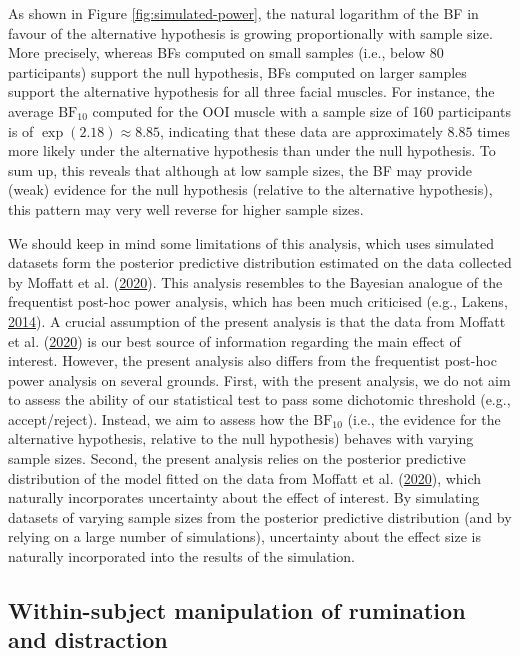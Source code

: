 \documentclass[
  english,
  man, donotrepeattitle,floatsintext]{apa6}
\begin{document}
As shown in Figure \ref{fig:simulated-power}, the natural logarithm of the BF in favour of the alternative hypothesis is growing proportionally with sample size. More precisely, whereas BFs computed on small samples (i.e., below 80 participants) support the null hypothesis, BFs computed on larger samples support the alternative hypothesis for all three facial muscles. For instance, the average \(\text{BF}_{10}\) computed for the OOI muscle with a sample size of 160 participants is of \(\exp(2.18) \approx 8.85\), indicating that these data are approximately \(8.85\) times more likely under the alternative hypothesis than under the null hypothesis. To sum up, this reveals that although at low sample sizes, the BF may provide (weak) evidence for the null hypothesis (relative to the alternative hypothesis), this pattern may very well reverse for higher sample sizes.

We should keep in mind some limitations of this analysis, which uses simulated datasets form the posterior predictive distribution estimated on the data collected by Moffatt et al. (\protect\hyperlink{ref-moffatt_inner_2020}{2020}). This analysis resembles to the Bayesian analogue of the frequentist post-hoc power analysis, which has been much criticised (e.g., Lakens, \protect\hyperlink{ref-lakens_20_2014}{2014}). A crucial assumption of the present analysis is that the data from Moffatt et al. (\protect\hyperlink{ref-moffatt_inner_2020}{2020}) is our best source of information regarding the main effect of interest. However, the present analysis also differs from the frequentist post-hoc power analysis on several grounds. First, with the present analysis, we do not aim to assess the ability of our statistical test to pass some dichotomic threshold (e.g., accept/reject). Instead, we aim to assess how the \(\text{BF}_{10}\) (i.e., the evidence for the alternative hypothesis, relative to the null hypothesis) behaves with varying sample sizes. Second, the present analysis relies on the posterior predictive distribution of the model fitted on the data from Moffatt et al. (\protect\hyperlink{ref-moffatt_inner_2020}{2020}), which naturally incorporates uncertainty about the effect of interest. By simulating datasets of varying sample sizes from the posterior predictive distribution (and by relying on a large number of simulations), uncertainty about the effect size is naturally incorporated into the results of the simulation.

\hypertarget{within-subject-manipulation-of-rumination-and-distraction}{%
\subsection{Within-subject manipulation of rumination and distraction}\label{within-subject-manipulation-of-rumination-and-distraction}}
\end{document}
